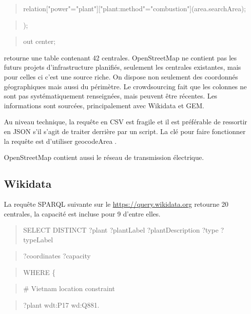 \documentclass[a4paper,11pt]{report}
\begin{document}
\begin{quote}
relation{[}"power"="plant"{]}{[}"plant:method"="combustion"{]}(area.searchArea);
\end{quote}

\begin{quote}
);
\end{quote}

\begin{quote}
out center;
\end{quote}

retourne une table contenant 42 centrales. OpenStreetMap ne contient pas les futurs projets d'infrastructure planifiés, seulement les centrales existantes, mais pour celles ci c'est une source riche. On dispose non seulement des coordonnés géographiques mais aussi du périmètre. Le crowdsourcing fait que les colonnes ne sont pas systématiquement renseignées, mais peuvent être récentes. Les informations sont sourcées, principalement avec Wikidata et GEM.

Au niveau technique, la requête en CSV est fragile et il est préférable de ressortir en JSON s'il s'agit de traiter derrière par un script. La clé pour faire fonctionner la requête est d'utiliser geocodeArea .

OpenStreetMap contient aussi le réseau de transmission électrique.

\subsection{Wikidata}\label{wikidata}

La requête SPARQL suivante sur le \href{https://query.wikidata.org/}{https://query.wikidata.org} retourne 20 centrales, la capacité est incluse pour 9 d'entre elles.

\begin{quote}
SELECT DISTINCT ?plant ?plantLabel ?plantDescription ?type ?typeLabel
\end{quote}

\begin{quote}
?coordinates ?capacity
\end{quote}

\begin{quote}
WHERE \{
\end{quote}

\begin{quote}
\# Vietnam location constraint
\end{quote}

\begin{quote}
?plant wdt:P17 wd:Q881.
\end{quote}
\end{document}
